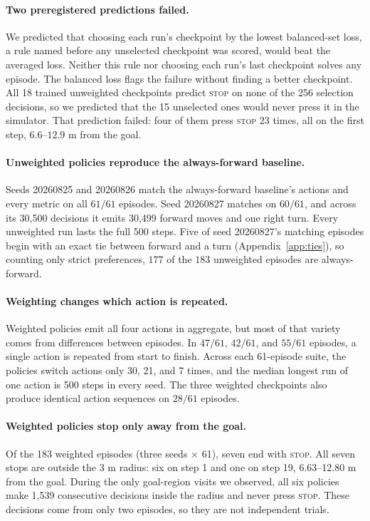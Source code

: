 \paragraph{Two preregistered predictions failed.}
We predicted that choosing each run's checkpoint by the lowest balanced-set loss, a rule named
before any unselected checkpoint was scored, would beat the averaged loss. Neither this rule
nor choosing each run's last checkpoint solves any episode.
The balanced loss flags the failure without finding a better checkpoint. All 18 trained
unweighted checkpoints predict \textsc{stop} on none of the 256 selection decisions, so we predicted
that the 15 unselected ones would never press it in the simulator. That prediction failed: four of
them press \textsc{stop} $23$ times, all on the first step, $6.6$--$12.9$ m from the goal.



\paragraph{Unweighted policies reproduce the always-forward baseline.}
Seeds 20260825 and 20260826 match the always-forward baseline's actions and every metric on all
$61/61$ episodes. Seed 20260827 matches on $60/61$, and across its 30,500 decisions it emits 30,499
forward moves and one right turn. Every unweighted run lasts the full 500 steps. Five of seed
20260827's matching episodes begin with an exact tie between forward and a turn
(Appendix~\ref{app:ties}), so counting only strict preferences, $177$ of the $183$ unweighted
episodes are always-forward.

\paragraph{Weighting changes which action is repeated.}
Weighted policies emit all four actions in aggregate, but most of that variety comes from differences
between episodes.
In $47/61$, $42/61$, and $55/61$ episodes, a single action is repeated from start to finish. Across
each 61-episode suite, the policies switch actions only 30, 21, and 7 times, and the median longest
run of one action is 500 steps in every seed. The three weighted checkpoints also produce identical
action sequences on $28/61$ episodes.

\paragraph{Weighted policies stop only away from the goal.}
Of the 183 weighted episodes (three seeds $\times$ 61), seven end with \textsc{stop}. All seven
stops are outside the 3 m radius: six on step 1 and one on step 19, 6.63--12.80 m from the goal.
During the only goal-region visits we observed, all six policies make 1,539 consecutive decisions
inside the radius and never press \textsc{stop}. These decisions come from only two episodes, so
they are not independent trials.

